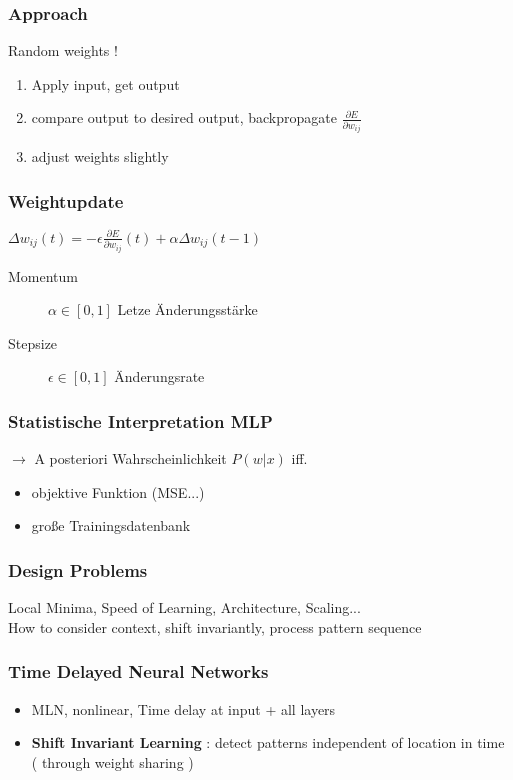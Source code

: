 \subsubsection{Approach}

Random weights !
\begin{enumerate}
	\item Apply input, get output
	\item compare output to desired output, backpropagate $\frac{\partial E}{\partial w_{ij}}$
	\item adjust weights slightly
\end{enumerate}

\subsubsection{Weightupdate}

$\Delta w_{ij}(t) = -\epsilon \frac{\partial E}{\partial w_{ij}} (t) + \alpha \Delta w_{ij} (t - 1)$

\begin{description}
	\item[Momentum] $\alpha \in [0, 1]$ Letze Änderungsstärke
	\item[Stepsize] $\epsilon \in [0, 1]$ Änderungsrate
\end{description}

\subsubsection{Statistische Interpretation MLP}

$\rightarrow$ A posteriori Wahrscheinlichkeit $P(w|x)$
iff. 
\begin{itemize}
	\item objektive Funktion (MSE...)
	\item große Trainingsdatenbank
\end{itemize}

\subsubsection{Design Problems}

Local Minima, Speed of Learning, Architecture, Scaling...\\
How to consider context, shift invariantly, process pattern sequence

\subsubsection{Time Delayed Neural Networks}

\begin{itemize}
	\item MLN, nonlinear, Time delay at input + all layers
	\item \textbf{Shift Invariant Learning} : detect patterns independent of location in time ( through weight sharing )
\end{itemize}